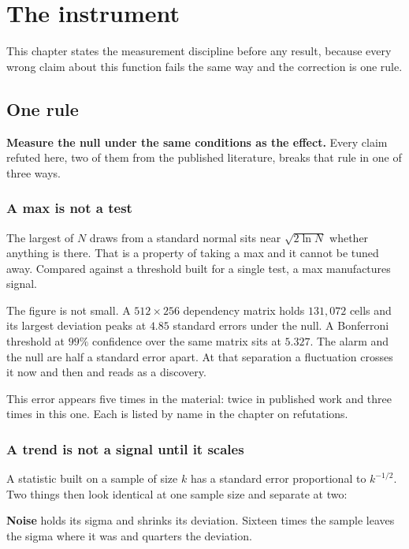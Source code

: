 \chapter{The instrument}

This chapter states the measurement discipline before any result, because every wrong claim about this function fails the same way and the correction is one rule.

\section{One rule}

\textbf{Measure the null under the same conditions as the effect.} Every claim refuted here, two of them from the published literature, breaks that rule in one of three ways.

\subsection{A max is not a test}

The largest of \(N\) draws from a standard normal sits near \(\sqrt{2 \ln N}\) whether anything is there. That is a property of taking a max and it cannot be tuned away. Compared against a threshold built for a single test, a max manufactures signal.

The figure is not small. A \(512 \times 256\) dependency matrix holds \(131{,}072\) cells and its largest deviation peaks at \(4.85\) standard errors under the null. A Bonferroni threshold at \(99\%\) confidence over the same matrix sits at \(5.327\). The alarm and the null are half a standard error apart. At that separation a fluctuation crosses it now and then and reads as a discovery.

This error appears five times in the material: twice in published work and three times in this one. Each is listed by name in the chapter on refutations.

\subsection{A trend is not a signal until it scales}

A statistic built on a sample of size \(k\) has a standard error proportional to \(k^{-1/2}\). Two things then look identical at one sample size and separate at two:

\textbf{Noise} holds its sigma and shrinks its deviation. Sixteen times the sample leaves the sigma where it was and quarters the deviation.

